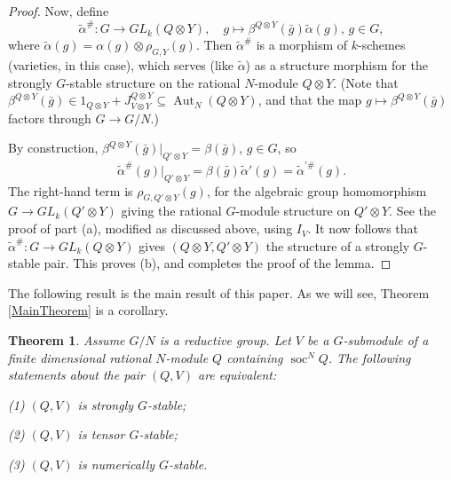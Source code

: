 \documentclass[11pt,leqno,amscd,amssymb,verbatim, url]{amsart}
\newtheorem{thm}{Theorem}[section]%
\theoremstyle{definition}
\numberwithin{equation}{thm}
\newcommand{\soc}{\operatorname{soc}}
\newcommand{\Aut}{\operatorname{Aut}}
\begin{document}
\begin{proof}
Now, define 
$$\widetilde\alpha^\#:G\to GL_k(Q\otimes Y),\quad g
\mapsto \beta^{Q\otimes Y}(\bar g)\widetilde\alpha(g), \,g\in G,$$
where $\widetilde\alpha(g)= \alpha(g)\otimes \rho_{G,Y}(g)$.   Then $\widetilde\alpha^\#$ is a morphism of
$k$-schemes (varieties, in this case), which serves (like $\widetilde\alpha$) as a structure morphism
for the strongly $G$-stable structure on the rational $N$-module $Q\otimes Y$. (Note that
$\beta^{Q\otimes Y}(\bar g)\in 1_{Q\otimes Y}+J^{Q\otimes Y}_{V\otimes Y}\subseteq \Aut_N(Q\otimes Y)$, and that the map $g\mapsto \beta^{Q\otimes Y}(\bar g)$ factors
through $G\to G/N$.) 

By construction, $\beta^{Q\otimes Y}(\bar g)|_{Q'\otimes Y}=\beta(\bar g)$, $g\in G$, so
$$\widetilde\alpha^\#(g)|_{Q'\otimes Y}=\beta(\bar g)\widetilde\alpha'(g)=\widetilde\alpha^{\prime\#}(g).$$
The right-hand term is $\rho_{G,Q'\otimes Y}(g)$, for the algebraic group homomorphism
$G\to GL_k(Q'\otimes Y)$ giving the rational $G$-module structure on $Q'\otimes Y$. See the proof of
part (a), modified as discussed above, using $I_V$. It now follows that $\widetilde\alpha^\#:G\to GL_k(Q\otimes Y)$ gives
$(Q\otimes Y,Q'\otimes Y)$ the structure of a strongly $G$-stable pair. This proves (b), and 
completes the proof of the lemma.
\end{proof}


The following result is the main result of this paper. As we will see, Theorem \ref{MainTheorem} is a corollary.

\begin{thm}\label{realmaintheorem} Assume $G/N$ is a reductive group.  Let $V$ be a $G$-submodule of
a finite dimensional rational $N$-module $Q$ containing $\soc^NQ$. The following statements about the pair $(Q,V)$
are equivalent:

(1) $(Q,V)$ is strongly $G$-stable;

(2) $(Q,V)$ is tensor $G$-stable;

(3) $(Q,V)$ is numerically $G$-stable.
\end{thm}
\end{document}
